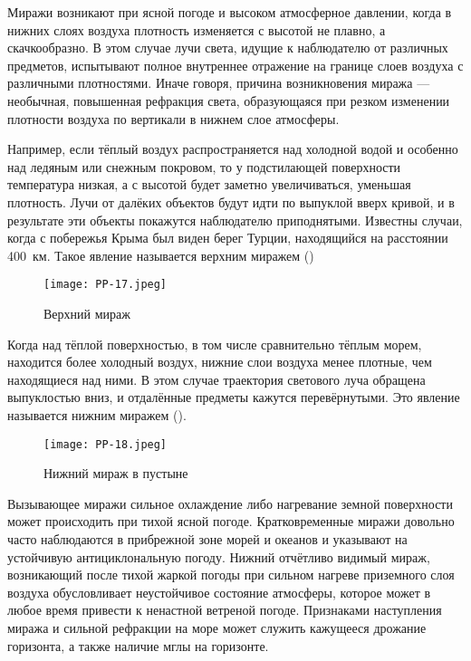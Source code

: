 Миражи возникают при ясной погоде и высоком атмосферное давлении,
когда в нижних слоях воздуха плотность изменяется с высотой не плавно,
а скачкообразно. В этом случае лучи света, идущие к наблюдателю от
различных предметов, испытывают полное внутреннее отражение на границе
слоев воздуха с различными плотностями. Иначе говоря, причина
возникновения миража — необычная, повышенная рефракция света,
образующаяся при резком изменении плотности воздуха по вертикали в
нижнем слое атмосферы.

Например, если тёплый воздух распространяется над холодной водой и
особенно над ледяным или снежным покровом, то у подстилающей
поверхности температура низкая, а с высотой будет заметно
увеличиваться, уменьшая плотность. Лучи от далёких объектов будут идти
по выпуклой вверх кривой, и в результате эти объекты покажутся
наблюдателю приподнятыми. Известны случаи, когда с побережья Крыма был
виден берег Турции, находящийся на расстоянии 400~км. Такое явление
называется верхним миражем ()

\begin{figure}[htb]
  \centering{}
  \texttt{[image: PP-17.jpeg]}
  \caption{Верхний мираж}
  \label{fig:pp17}
  \small
  \centering{}
\end{figure}

Когда над тёплой поверхностью, в том числе сравнительно тёплым морем,
находится более холодный воздух, нижние слои воздуха менее плотные,
чем находящиеся над ними. В этом случае траектория светового луча
обращена выпуклостью вниз, и отдалённые предметы кажутся
перевёрнутыми. Это явление называется нижним миражем ().

\begin{figure}[htb]
  \centering{}
  \texttt{[image: PP-18.jpeg]}
  \caption{Нижний мираж в пустыне}
  \label{fig:pp18}
  \small
  \centering{}
\end{figure}

Вызывающее миражи сильное охлаждение либо нагревание земной
поверхности может происходить при тихой ясной погоде. Кратковременные
миражи довольно часто наблюдаются в прибрежной зоне морей и океанов и
указывают на устойчивую антициклональную погоду. Нижний отчётливо
видимый мираж, возникающий после тихой жаркой погоды при сильном
нагреве приземного слоя воздуха обусловливает неустойчивое состояние
атмосферы, которое может в любое время привести к ненастной ветреной
погоде. Признаками наступления миража и сильной рефракции на море
может служить кажущееся дрожание горизонта, а также наличие мглы на
горизонте.

